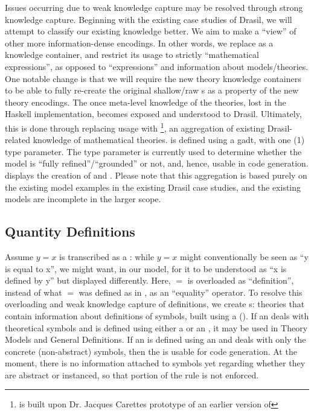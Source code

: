 Issues occurring due to weak knowledge capture may be resolved through strong
knowledge capture. Beginning with the existing case studies of Drasil, we will
attempt to classify our existing knowledge better. We aim to make
\RelationConcept{} a ``view'' of other more information-dense encodings. In
other words, we replace \Expr{} as a knowledge container, and restrict its usage
to strictly ``mathematical expressions'', as opposed to ``expressions'' and
information about models/theories. One notable change is that we will require
the new theory knowledge containers to be able to fully re-create the original
shallow/raw \Expr{}s as a property of the new theory encodings. The once
meta-level knowledge of the theories, lost in the Haskell implementation,
becomes exposed and understood to Drasil. Ultimately, this is done through
replacing \RelationConcept{} usage with \ModelKind{}\footnote{\ModelKind{} is
built upon Dr. Jacques Carettes prototype of an earlier version of
\ModelKinds{}}, an aggregation of existing Drasil-related knowledge of
mathematical theories. \ModelKind{} is defined using a \acs{gadt}, with one (1)
type parameter. The type parameter is currently used to determine whether the
model is ``fully refined''/``grounded'' or not, and, hence, usable in code
generation.  displays the creation of \ModelKind{}
and \ModelKinds{}. Please note that this aggregation is based purely on the
existing model examples in the existing Drasil case studies, and the existing
models are incomplete in the larger scope.


\currentModelKindsHaskell{}

\subsection{Quantity Definitions}

\currentQDefinitionHaskell{}

Assume \(y = x\) is transcribed as a \RelationConcept{}: while \(y = x\) might
conventionally be seen as ``y is equal to x'', we might want, in our model, for
it to be understood as ``x is defined by y'' but displayed differently. Here,
\(=\) is overloaded as ``definition'', instead of what \(=\) was defined as in
\Expr{}, as an ``equality'' operator. To resolve this overloading and weak
knowledge capture of definitions, we create \EquationalModel{}s: theories that
contain information about definitions of symbols, built using a \QDefinition{}
(). If an \EquationalModel{} deals with
theoretical symbols and is defined using either a \ModelExpr{} or an \Expr{}, it
may be used in Theory Models and General Definitions. If an \EquationalModel{}
is defined using an \Expr{} and deals with only the concrete (non-abstract)
symbols, then the \EquationalModel{} is usable for code generation. At the
moment, there is no information attached to symbols yet regarding whether they
are abstract or instanced, so that portion of the rule is not enforced.


